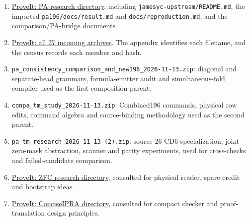\documentclass[11pt,a4paper]{article}
\newcommand{\file}[1]{\texttt{\nolinkurl{#1}}}
\begin{document}
\begin{enumerate}
\item \href{https://github.com/VladimirReshetnikov/ProveIt/tree/906367250a7f96c923147b10df392294bced7be5/Computability/BusyBeaver/Research/PA}{ProveIt: PA research directory}, including
\file{jamesyc-upstream/README.md}, the imported \file{pa196/docs/result.md}
and \file{docs/reproduction.md}, and the comparison/PA-bridge documents.
\item \href{https://github.com/VladimirReshetnikov/ProveIt/tree/906367250a7f96c923147b10df392294bced7be5/docs/incoming}{ProveIt: all 27 incoming archives}. The appendix identifies each filename,
and the census records each member and hash.
\item \file{pa_consistency_comparison_and_new196_2026-11-13.zip}:
diagonal and separate-head grammars, formula-emitter audit and
simultaneous-fold compiler used as the first composition parent.
\item \file{conpa_tm_study_2026-11-13.zip}: Combined196 commands,
physical row edits, command algebra and source-binding methodology
used as the second parent.
\item \file{pa_tm_research_2026-11-13 (2).zip}: source 26 CD6
specialization, joint zero-mask abstraction, scanner and parity
experiments, used for cross-checks and failed-candidate comparison.
\item \href{https://github.com/VladimirReshetnikov/ProveIt/tree/906367250a7f96c923147b10df392294bced7be5/Computability/BusyBeaver/Research/ZFC}{ProveIt: ZFC research directory}, consulted for physical reader,
spare-credit and bootstrap ideas.
\item \href{https://github.com/VladimirReshetnikov/ProveIt/tree/906367250a7f96c923147b10df392294bced7be5/Logic/PrimitiveRecursiveArithmetic/ConciseIPRA}{ProveIt: ConciseIPRA directory}, consulted for compact checker and
proof-translation design principles.
\end{enumerate}

\appendix



\end{document}
